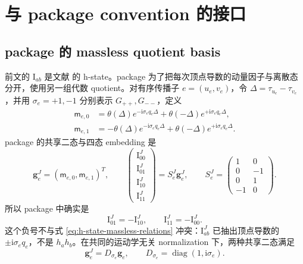 \documentclass[11pt,a4paper]{ctexart}
\newcommand{\ii}{\mathrm i}
\begin{document}
\section{与 package convention 的接口}
\label{sec:package-adapter}

\subsection{package 的 massless quotient basis}

前文的 $\text{I}_{ab}$ 是文献 \cite{Chen:2023eic} 的 h-state。package 为了把每次顶点导数的动量因子与离散态分开，使用另一组代数 quotient。对有序传播子 $e=(u_e,v_e)$，令 $\Delta=\tau_{u_e}-\tau_{v_e}$，并用 $\sigma_e=+1,-1$ 分别表示 $G_{++},G_{--}$，定义
\begin{align}
 \mathsf m_{e,0}&=\theta(\Delta)e^{-\ii\sigma_eq_e\Delta}
       +\theta(-\Delta)e^{+\ii\sigma_eq_e\Delta},\\
 \mathsf m_{e,1}&=-\theta(\Delta)e^{-\ii\sigma_eq_e\Delta}
       +\theta(-\Delta)e^{+\ii\sigma_eq_e\Delta}.
 \label{eq:package-M01}
\end{align}
package 的共享二态与四态 embedding 是
\begin{equation}
 \bm g_e^J=(\mathsf m_{e,0},\mathsf m_{e,1})^T,
 \qquad
 \begin{pmatrix}\text{I}^J_{00}\\\text{I}^J_{01}\\\text{I}^J_{10}\\\text{I}^J_{11}\end{pmatrix}
 =S_e^J\bm g_e^J,
 \qquad
 S_e^J=
 \begin{pmatrix}
  1&0\\0&-1\\0&1\\-1&0
 \end{pmatrix}.
 \label{eq:package-S-massless}
\end{equation}
所以 package 中确实是
\begin{equation}
 \text{I}^J_{01}=-\text{I}^J_{10},
 \qquad
 \text{I}^J_{11}=-\text{I}^J_{00}.
 \label{eq:package-quotient-relations}
\end{equation}
这个负号不与式 \eqref{eq:h-state-massless-relations} 冲突：$\text{I}^J_{ab}$ 已抽出顶点导数的 $\pm\ii\sigma_eq_e$，不是 $h_a h_b$。在共同的运动学无关 normalization 下，两种共享二态满足
\begin{equation}
 \bm g_e^J=D_{\sigma_e}\bm g_e,
 \qquad
 D_{\sigma_e}=\operatorname{diag}(1,\ii\sigma_e).
 \label{eq:h-to-package-basis}
\end{equation}
\end{document}
